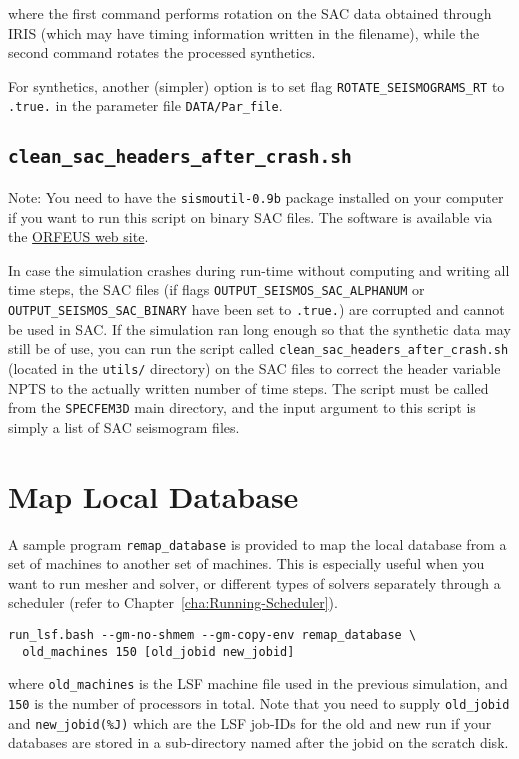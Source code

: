 \noindent
where the first command performs rotation on the SAC data obtained
through IRIS (which may have timing information written in the filename),
while the second command rotates the processed synthetics.\newline


For synthetics, another (simpler) option is to set flag \texttt{ROTATE\_SEISMOGRAMS\_RT}
to \texttt{.true.} in the parameter file \texttt{DATA/Par\_file}.


\subsection{\texttt{clean\_sac\_headers\_after\_crash.sh}}

Note: You need to have the \texttt{sismoutil-0.9b} package installed
on your computer if you want to run this script on binary SAC files.
The software is available via the \href{http://www.orfeus-eu.org}{ORFEUS web site}.\newline


In case the simulation crashes during run-time without computing and
writing all time steps, the SAC files (if flags \texttt{OUTPUT\_SEISMOS\_SAC\_ALPHANUM}
or \texttt{OUTPUT\_SEISMOS\_SAC\_BINARY} have been set to \texttt{.true.})
are corrupted and cannot be used in SAC. If the simulation
ran long enough so that the synthetic data may still be of use, you
can run the script called \texttt{clean\_sac\_headers\_after\_crash.sh}
(located in the \texttt{utils/} directory) on the SAC files to correct
the header variable NPTS to the actually written number of time steps.
The script must be called from the \texttt{SPECFEM3D} main directory,
and the input argument to this script is simply a list of SAC seismogram
files.


\section{Map Local Database}

A sample program \texttt{remap\_database} is provided to map the local
database from a set of machines to another set of machines. This is
especially useful when you want to run mesher and solver, or different
types of solvers separately through a scheduler (refer to Chapter~\ref{cha:Running-Scheduler}).
\begin{verbatim}
run_lsf.bash --gm-no-shmem --gm-copy-env remap_database \
  old_machines 150 [old_jobid new_jobid]
\end{verbatim}
where \texttt{old\_machines} is the LSF machine file used in the previous
simulation, and \texttt{150} is the number of processors in total.
Note that you need to supply \texttt{old\_jobid} and \texttt{new\_jobid(\%J)}
which are the LSF job-IDs for the old and new run if your databases
are stored in a sub-directory named after the jobid on the scratch
disk.




